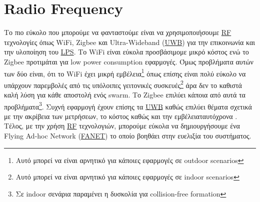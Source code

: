 


\section{Radio Frequency}
Το πιο εύκολο που μπορούμε να φανταστούμε είναι να χρησιμοποιήσουμε \hyperref[abbr:RF]{RF} τε\-χνο\-λο\-γίες
όπως WiFi, Zigbee και Ultra-Wideband (\hyperref[abbr:UWB]{UWB}) για την επικοινωνία και την υλοποίηση του \hyperref[abbr:LPS]{LPS}.   
Το WiFi είναι εύκολα προσβάσιμο\udot με μικρό κόστος ενώ το Zigbee προτιμάται για
low power consumption εφαρμογές. Όμως προβλήματα αυτών των δύο είναι, ότι το 
WiFi έχει μικρή εμβέλεια\footnote{Αυτό μπορεί να είναι αρνητικό για κάποιες εφαρμογές σε outdoor scenarios} όπως επίσης είναι πολύ εύκολο 
να υπάρχουν παρεμβολές από τις υπόλοιπες γειτονικές συσκευές\footnote{Αυτό μπορεί να είναι αρνητικό για κάποιες εφαρμογές σε indoor scenarios} 
άρα δεν το καθιστά καλή λύση για κάθε αποστολή ενός swarm. Το Zigbee επιλύει κάποια από αυτά τα 
προβλήματα\footnote{Σε indoor σενάρια παραμένει η δυσκολία για collision-free formation}. Συχνή εφαρμογή έχουν επίσης 
τα \hyperref[abbr:UWB]{UWB} καθώς επιλύει θέματα σχετικά με την ακρίβεια των μετρήσεων, το κόστος καθώς και την 
εμβέλεια\udot ταυτόχρονα \cite{uwb-imu-gps3}. Τέλος, με την χρήση \hyperref[abbr:RF]{RF} τεχνολογιών, μπορούμε εύκολα να δημιουργήσουμε
ένα Flying Ad-hoc Network (\hyperref[abbr:FANET]{FANET}) το οποίο βοηθάει στην ευελιξία του συστήματος.


